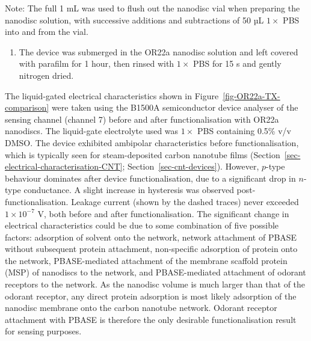 \documentclass[
  a4paper,
]{scrbook}
\providecommand{\tightlist}{%
  \setlength{\itemsep}{0pt}\setlength{\parskip}{0pt}}\usepackage{longtable,booktabs,array}
\begin{document}
Note: The full 1 mL was used to flush out the nanodisc vial when
preparing the nanodisc solution, with successive additions and
subtractions of 50 µL \(1 \times\) PBS into and from the vial.

\begin{enumerate}
\def\labelenumi{\arabic{enumi}.}
\setcounter{enumi}{6}
\tightlist
\item
  The device was submerged in the OR22a nanodisc solution and left
  covered with parafilm for 1 hour, then rinsed with \(1 \times\) PBS
  for 15 s and gently nitrogen dried.
\end{enumerate}

The liquid-gated electrical characteristics shown in
Figure~\ref{fig-OR22a-TX-comparison} were taken using the B1500A
semiconductor device analyser of the sensing channel (channel 7) before
and after functionalisation with OR22a nanodiscs. The liquid-gate
electrolyte used was \(1 \times\) PBS containing 0.5\% v/v DMSO. The
device exhibited ambipolar characteristics before functionalisation,
which is typically seen for steam-deposited carbon nanotube films
(Section~\ref{sec-electrical-characterisation-CNT};
Section~\ref{sec-cnt-devices}). However, \(p\)-type behaviour dominates
after device functionalisation, due to a significant drop in \(n\)-type
conductance. A slight increase in hysteresis was observed
post-functionalisation. Leakage current (shown by the dashed traces)
never exceeded \(1 \times 10^{-7}\) V, both before and after
functionalisation. The significant change in electrical characteristics
could be due to some combination of five possible factors: adsorption of
solvent onto the network, network attachment of PBASE without subsequent
protein attachment, non-specific adsorption of protein onto the network,
PBASE-mediated attachment of the membrane scaffold protein (MSP) of
nanodiscs to the network, and PBASE-mediated attachment of odorant
receptors to the network. As the nanodisc volume is much larger than
that of the odorant receptor, any direct protein adsorption is most
likely adsorption of the nanodisc membrane onto the carbon nanotube
network. Odorant receptor attachment with PBASE is therefore the only
desirable functionalisation result for sensing purposes.
\end{document}
